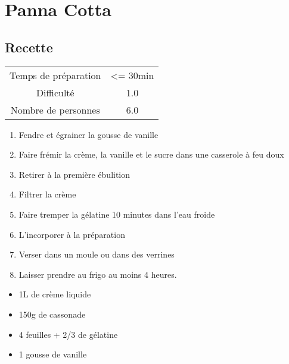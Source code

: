 \newpage
\section{Panna Cotta}
    \label{sec:Panna Cotta}
    \subsection{Recette}
    \vspace{1cm}


    \begin{center}
        \begin{tabular}{c|c}
            Temps de préparation & <= 30min \\
            Difficulté & 1.0 \\
            Nombre de personnes & 6.0 
        \end{tabular}
    \end{center}{}

    \vspace{1cm}
    \hline
    \vspace{1cm}

    \begin{minipage}{.7\textwidth}
        \begin{enumerate}
            \item Fendre et égrainer la gousse de vanille
	    \item Faire frémir la crème, la vanille et le sucre dans une casserole à feu doux
	    \item Retirer à la première ébulition
	    \item Filtrer la crème
	    \item Faire tremper la gélatine 10 minutes dans l'eau froide
	    \item L'incorporer à la préparation
	    \item Verser dans un moule ou dans des verrines
	    \item Laisser prendre au frigo au moins 4 heures.

        \end{enumerate}
    \end{minipage}
    \begin{minipage}{.3\textwidth}
        \begin{flushleft}
        \begin{itemize}
            \item 1L de crème liquide
	    \item 150g de cassonade
	    \item 4 feuilles + 2/3 de gélatine
	    \item 1 gousse de vanille

        \end{itemize}
        \end{flushleft}
    \end{minipage}
    
